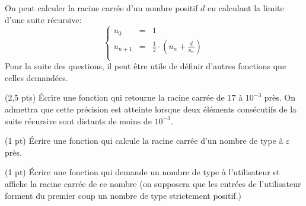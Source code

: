 
On peut calculer la racine carr{\'e}e d'un nombre positif $d$ en calculant
la limite d'une suite r{\'e}cursive:
$$
\left\lbrace
\begin{array}{rcl}
u_0 &=& 1 \\
u_{n+1}&=& \frac 12 \cdot ( u_n + \frac d {u_n} )\\
\end{array}
\right.
$$
Pour la suite des questions, il peut {\^e}tre utile de d{\'e}finir d'autres
fonctions que celles demand{\'e}es.

\question (2,5 pts) {\'E}crire une fonction  qui
retourne la racine carr{\'e}e de $17$ {\`a} $10^{-3}$ pr{\`e}s. On
admettra que cette pr{\'e}cision est atteinte lorsque deux {\'e}l{\'e}ments
cons{\'e}cutifs de la suite r{\'e}cursive sont distants de moins de $10^{-3}$.

\question (1 pt) {\'E}crire une fonction  qui calcule la racine
  carr{\'e}e d'un nombre de type  {\`a} $\varepsilon$
  pr{\`e}s.

\question (1 pt) {\'E}crire une fonction qui demande un nombre de type
 {\`a} l'utilisateur et affiche la racine carr{\'e}e de
ce nombre (on supposera que les entr{\'e}es de l'utilisateur forment
du premier coup un nombre de type  strictement positif.)

